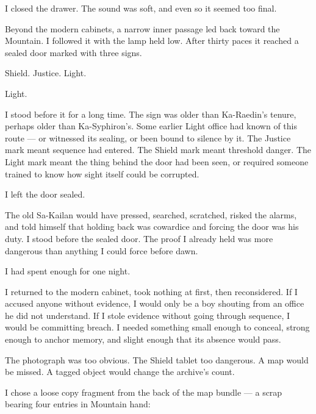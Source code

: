 I closed the drawer. The sound was soft, and even so it seemed too final.\par

Beyond the modern cabinets, a narrow inner passage led back toward the Mountain. I followed it with the lamp held low. After thirty paces it reached a sealed door marked with three signs.\par

Shield. Justice. Light.\par

Light.\par

I stood before it for a long time. The sign was older than Ka-Raedin's tenure, perhaps older than Ka-Syphiron's. Some earlier Light office had known of this route --- or witnessed its sealing, or been bound to silence by it. The Justice mark meant sequence had entered. The Shield mark meant threshold danger. The Light mark meant the thing behind the door had been seen, or required someone trained to know how sight itself could be corrupted.\par

I left the door sealed.\par

The old Sa-Kailan would have pressed, searched, scratched, risked the alarms, and told himself that holding back was cowardice and forcing the door was his duty. I stood before the sealed door. The proof I already held was more dangerous than anything I could force before dawn.\par

I had spent enough for one night.\par

I returned to the modern cabinet, took nothing at first, then reconsidered. If I accused anyone without evidence, I would only be a boy shouting from an office he did not understand. If I stole evidence without going through sequence, I would be committing breach. I needed something small enough to conceal, strong enough to anchor memory, and slight enough that its absence would pass.\par

The photograph was too obvious. The Shield tablet too dangerous. A map would be missed. A tagged object would change the archive's count.\par

I chose a loose copy fragment from the back of the map bundle --- a scrap bearing four entries in Mountain hand:\par

